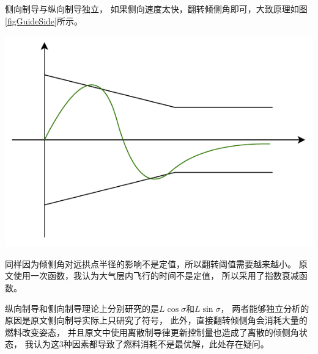 侧向制导与纵向制导独立，
如果侧向速度太快，翻转倾侧角即可，大致原理如图\ref{figGuideSide}所示。
\begin{center}
	\includegraphics[scale=0.7]{GuideSide.pdf}  \\
	\label{figGuideSide}
\end{center}
同样因为倾侧角对远拱点半径的影响不是定值，所以翻转阈值需要越来越小。
原文使用一次函数，我认为大气层内飞行的时间不是定值，
所以采用了指数衰减函数。

纵向制导和侧向制导理论上分别研究的是$L\cos\sigma$和$L\sin\sigma$，
两者能够独立分析的原因是原文侧向制导实际上只研究了符号，
此外，直接翻转倾侧角会消耗大量的燃料改变姿态，
并且原文中使用离散制导律更新控制量也造成了离散的倾侧角状态，
我认为这3种因素都导致了燃料消耗不是最优解，此处存在疑问。

